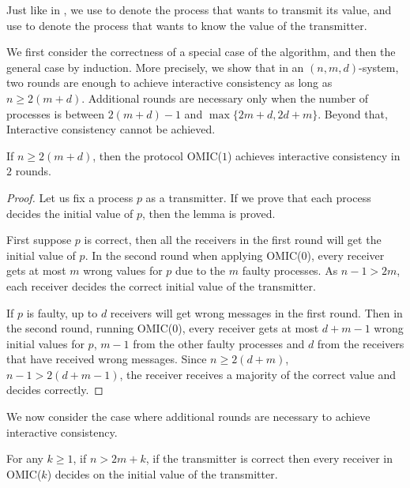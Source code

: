 Just like in
{\cite{lamport1982byzantine}}, we use  to denote the process
that wants to transmit its value, and use  to denote the process that wants to know the value of the transmitter. 

We first consider the correctness of a special case of the algorithm, and then 
the general case by induction.
More precisely, we show that in an $( n,m,d)$-system, two rounds are enough to achieve interactive consistency as long as 
$n \geqslant 2 ( m+d )$.
Additional rounds are necessary only when the number of processes is between $2 ( m+d ) - 1$ and $ \max \{ 2m+d,2d+m \}$. Beyond that, Interactive consistency cannot be achieved.


\begin{lemma} \label{basicCase}
  \label{2roundlemma} If $n \geqslant 2 ( m+d )$, then the protocol OMIC($1$) achieves
  interactive consistency in $2$ rounds.
\end{lemma}

\begin{proof}
  Let us fix a process $p$ as a transmitter. If we prove that  each process decides  the
  initial value of $p$, then the lemma is proved.
  
  First suppose $p$ is correct, then all the receivers in the
  first round will get the initial value of $p$. In the second
  round when applying OMIC($0$), every receiver gets at most $m$ wrong
  values for $p$ due to the $m$ faulty processes.
As $n-1>2m$, each
  receiver decides the correct initial value of the transmitter.
  
  If $p$ is faulty, up to $d$ receivers will get wrong messages
  in the first round. Then in the second round, running OMIC($0$), every
  receiver gets at most $d+m-1$ wrong initial values for $p$,
  $m-1$ from the other faulty processes and $d$ from the receivers that have received wrong messages.
   Since $n\geqslant 2 (d+m)$, $n-1 > 2(d+m-1)$, the receiver receives a majority of the correct value and decides correctly.
\end{proof}

We now consider the case where additional rounds are necessary to achieve interactive consistency.

\begin{lemma} \label{reliableCorretness}
  \label{reliablecase}
  For any $k \geqslant 1$, if $n>2m+k$, if the transmitter is correct
 then every receiver in  OMIC($k$) decides on the initial value of the transmitter.
\end{lemma}

